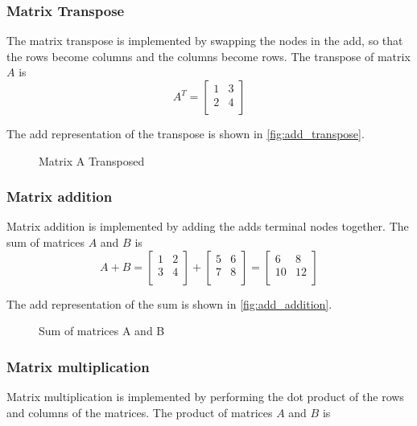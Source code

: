 \subsubsection{Matrix Transpose}
The matrix transpose is implemented by swapping the nodes in the \gls{add}, so that the rows become columns and the columns become rows.
The transpose of matrix $A$ is
\[
    A^T = \begin{bmatrix}
              1 & 3 \\
              2 & 4 \\
    \end{bmatrix}
\]

The \gls{add} representation of the transpose is shown in \autoref{fig:add_transpose}.
\begin{figure}
    \centering
    
    \caption{Matrix A Transposed}
    \label{fig:add_transpose}
\end{figure}

\subsubsection{Matrix addition}
Matrix addition is implemented by adding the \glspl{add} terminal nodes together.
The sum of matrices $A$ and $B$ is
\[
    A + B = \begin{bmatrix}
                1 & 2 \\
                3 & 4 \\
    \end{bmatrix} + \begin{bmatrix}
                        5 & 6 \\
                        7 & 8 \\
    \end{bmatrix} = \begin{bmatrix}
                        6  & 8  \\
                        10 & 12 \\
    \end{bmatrix}
\]

The \gls{add} representation of the sum is shown in \autoref{fig:add_addition}.
\begin{figure}
    \centering
    
    \caption{Sum of matrices A and B}
    \label{fig:add_addition}
\end{figure}

\subsubsection{Matrix multiplication}
Matrix multiplication is implemented by performing the dot product of the rows and columns of the matrices.
The product of matrices $A$ and $B$ is

